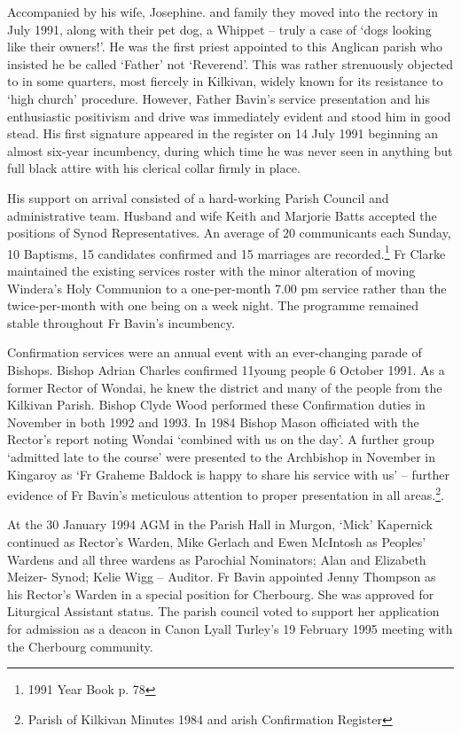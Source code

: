 Accompanied by his wife, Josephine. and family they moved into the rectory in July 1991, along with their pet dog, a Whippet -- truly a case of `dogs looking like their owners!'. He was the first priest appointed to this Anglican parish who insisted he be called `Father' not `Reverend'. This was rather strenuously objected to in some quarters, most fiercely in Kilkivan, widely known for its resistance to `high church' procedure. However, Father Bavin's service presentation and his enthusiastic positivism and drive was immediately evident and stood him in good stead. His first signature appeared in the register on 14 July 1991 beginning an almost six-year incumbency, during which time he was never seen in anything but full black attire with his clerical collar firmly in place.

His support on arrival consisted of a hard-working Parish Council and administrative team. Husband and wife Keith and Marjorie Batts accepted the positions of Synod Representatives. An average of 20 communicants each Sunday, 10 Baptisms, 15 candidates confirmed and 15 marriages are recorded.\footnote{1991 Year Book p. 78} Fr Clarke maintained the existing services roster with the minor alteration of moving Windera's Holy Communion to a one-per-month 7.00 pm service rather than the twice-per-month with one being on a week night. The programme remained stable throughout Fr Bavin's incumbency.

Confirmation services were an annual event with an ever-changing parade of Bishops. Bishop Adrian Charles confirmed 11young people 6 October 1991. As a former Rector of Wondai, he knew the district and many of the people from the Kilkivan Parish. Bishop Clyde Wood performed these Confirmation duties in November in both 1992 and 1993. In 1984 Bishop Mason officiated with the Rector's report noting Wondai `combined with us on the day'. A further group `admitted late to the course' were presented to the Archbishop in November in Kingaroy as `Fr Graheme Baldock is happy to share his service with us' -- further evidence of Fr Bavin's meticulous attention to proper presentation in all areas.\footnote{Parish of Kilkivan Minutes 1984 and arish Confirmation Register}.

At the 30 January 1994 AGM in the Parish Hall in Murgon, `Mick' Kapernick continued as Rector's Warden, Mike Gerlach and Ewen McIntosh as Peoples' Wardens and all three wardens as Parochial Nominators; Alan and Elizabeth Meizer- Synod; Kelie Wigg -- Auditor. Fr Bavin appointed Jenny Thompson as his Rector's Warden in a special position for Cherbourg. She was approved for Liturgical Assistant status. The parish council voted to support her application for admission as a deacon in Canon Lyall Turley's 19 February 1995 meeting with the Cherbourg community.

